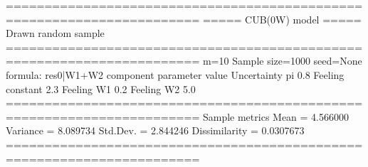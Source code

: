 \documentclass[letterpaper,10pt,english]{sphinxmanual}
\begin{document}
\begin{sphinxVerbatim}[commandchars=\\\{\}]
=======================================================================
=====\PYGZgt{}\PYGZgt{}\PYGZgt{} CUB(0W) model \PYGZlt{}\PYGZlt{}\PYGZlt{}===== Drawn random sample
=======================================================================
m=10  Sample size=1000  seed=None
formula: res\PYGZti{}0|W1+W2
\PYGZhy{}\PYGZhy{}\PYGZhy{}\PYGZhy{}\PYGZhy{}\PYGZhy{}\PYGZhy{}\PYGZhy{}\PYGZhy{}\PYGZhy{}\PYGZhy{}\PYGZhy{}\PYGZhy{}\PYGZhy{}\PYGZhy{}\PYGZhy{}\PYGZhy{}\PYGZhy{}\PYGZhy{}\PYGZhy{}\PYGZhy{}\PYGZhy{}\PYGZhy{}\PYGZhy{}\PYGZhy{}\PYGZhy{}\PYGZhy{}\PYGZhy{}\PYGZhy{}\PYGZhy{}\PYGZhy{}\PYGZhy{}\PYGZhy{}\PYGZhy{}\PYGZhy{}\PYGZhy{}\PYGZhy{}\PYGZhy{}\PYGZhy{}\PYGZhy{}\PYGZhy{}\PYGZhy{}\PYGZhy{}\PYGZhy{}\PYGZhy{}\PYGZhy{}\PYGZhy{}\PYGZhy{}\PYGZhy{}\PYGZhy{}\PYGZhy{}\PYGZhy{}\PYGZhy{}\PYGZhy{}\PYGZhy{}\PYGZhy{}\PYGZhy{}\PYGZhy{}\PYGZhy{}\PYGZhy{}\PYGZhy{}\PYGZhy{}\PYGZhy{}\PYGZhy{}\PYGZhy{}\PYGZhy{}\PYGZhy{}\PYGZhy{}\PYGZhy{}\PYGZhy{}\PYGZhy{}
  component parameter  value
Uncertainty        pi    0.8
    Feeling  constant    2.3
    Feeling        W1    0.2
    Feeling        W2   \PYGZhy{}5.0
=======================================================================
Sample metrics
Mean     = 4.566000
Variance = 8.089734
Std.Dev. = 2.844246
\PYGZhy{}\PYGZhy{}\PYGZhy{}\PYGZhy{}\PYGZhy{}\PYGZhy{}\PYGZhy{}\PYGZhy{}\PYGZhy{}\PYGZhy{}\PYGZhy{}\PYGZhy{}\PYGZhy{}\PYGZhy{}\PYGZhy{}\PYGZhy{}\PYGZhy{}\PYGZhy{}\PYGZhy{}\PYGZhy{}\PYGZhy{}\PYGZhy{}\PYGZhy{}\PYGZhy{}\PYGZhy{}\PYGZhy{}\PYGZhy{}\PYGZhy{}\PYGZhy{}\PYGZhy{}\PYGZhy{}\PYGZhy{}\PYGZhy{}\PYGZhy{}\PYGZhy{}\PYGZhy{}\PYGZhy{}\PYGZhy{}\PYGZhy{}\PYGZhy{}\PYGZhy{}\PYGZhy{}\PYGZhy{}\PYGZhy{}\PYGZhy{}\PYGZhy{}\PYGZhy{}\PYGZhy{}\PYGZhy{}\PYGZhy{}\PYGZhy{}\PYGZhy{}\PYGZhy{}\PYGZhy{}\PYGZhy{}\PYGZhy{}\PYGZhy{}\PYGZhy{}\PYGZhy{}\PYGZhy{}\PYGZhy{}\PYGZhy{}\PYGZhy{}\PYGZhy{}\PYGZhy{}\PYGZhy{}\PYGZhy{}\PYGZhy{}\PYGZhy{}\PYGZhy{}\PYGZhy{}
Dissimilarity = 0.0307673
=======================================================================
\end{sphinxVerbatim}
\def\sphinxLiteralBlockLabel{\label{\detokenize{manual:id47}}}
\begin{sphinxVerbatim}[commandchars=\\\{\},numbers=left,firstnumber=1,stepnumber=1]
\end{sphinxVerbatim}
\end{document}

